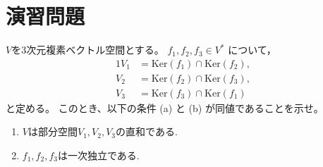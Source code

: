 \documentclass[report]{jlreq}
\begin{document}
\TODO{}

%
\newpage
\section{演習問題}

\begin{problem}[東大数理 2006A]
    $V$を3次元複素ベクトル空間とする。
    $f_{1},f_{2},f_{3}\in V^{*}$
    について，
    \begin{alignat}{1}
        V_{1} &= \mathrm{Ker}(f_{1})\cap\mathrm{Ker}(f_{2}), \\
        V_{2} &= \mathrm{Ker}(f_{2})\cap\mathrm{Ker}(f_{3}), \\
        V_{3} &= \mathrm{Ker}(f_{3})\cap\mathrm{Ker}(f_{1})
    \end{alignat}
    と定める。
    このとき、以下の条件 (a) と (b) が同値であることを示せ。
    \begin{enumerate}[label=(\alph*)]
        \item $V$は部分空間$V_1, V_2, V_3$の直和である.
        \item $f_1, f_2, f_3$は一次独立である.
    \end{enumerate}
\end{problem}
\end{document}
